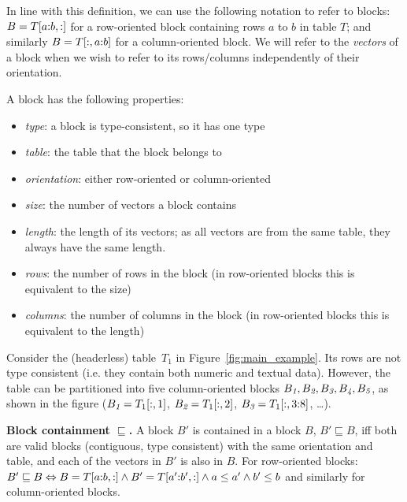 In line with this definition, we can use the following notation to refer to blocks: $B = T[a{:}b,:]$ for a row-oriented block containing rows $a$ to $b$ in table $T$; and similarly $B = T[{:},a{:}b]$ for a column-oriented block.
We will refer to the \textit{vectors} of a block when we wish to refer to its rows/columns independently of their orientation.


A block has the following properties:
\begin{itemize}
\item \textit{type}: a block is type-consistent, so it has one type
\item \textit{table}: the table that the block belongs to
\item \textit{orientation}: either row-oriented or column-oriented
\item \textit{size}: the number of vectors a block contains
\item \textit{length}: the length of its vectors; as all vectors are from the same table, they always have the same length.
\item \textit{rows}: the number of rows in the block
(in row-oriented blocks this is equivalent to the size)
\item \textit{columns}: the number of columns in the block (in row-oriented blocks this is equivalent to the length)
\end{itemize}



\begin{example}
Consider the (headerless) table~$T_1$ in Figure~\ref{fig:main_example}.
Its rows are not type consistent (i.e. they contain both numeric and textual data).
However, the table can be partitioned into five column-oriented blocks $B_{\textit{1}}, B_{\textit{2}}, B_{\textit{3}}, B_{\textit{4}}, B_{\textit{5}}$, as shown in the figure ($B_{\textit{1}} = T_1[:,1]$, $B_{\textit{2}} = T_1[:,2]$, $B_{\textit{3}} = T_1[:,3{:}8]$, \dots).
\end{example}

\begin{definition}
\textbf{Block containment $\sqsubseteq$.} 
A block $B'$ is contained in a block $B$, $B' \sqsubseteq B$, iff both are valid blocks (contiguous, type consistent) with the same orientation and table, and each of the vectors in $B'$ is also in $B$. For row-oriented blocks: $B' \sqsubseteq B \Leftrightarrow B=T[a{:}b,:] \wedge B'=T[a'{:}b',:] \wedge a \leq a' \wedge b' \leq b$ and similarly for column-oriented blocks.
\end{definition}

